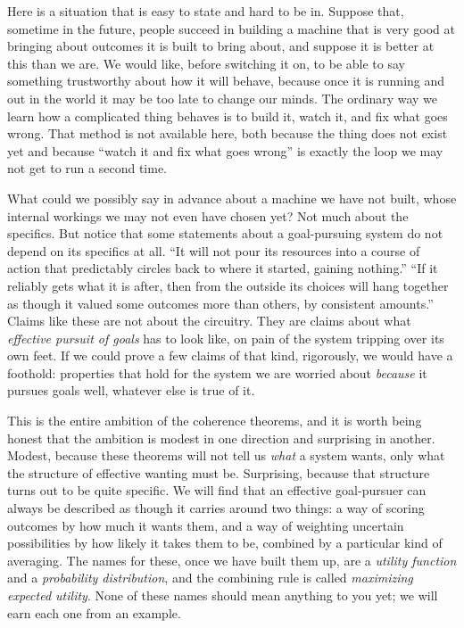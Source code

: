 \documentclass[10pt]{article}
\theoremstyle{definition}
\theoremstyle{remark}
\begin{document}
Here is a situation that is easy to state and hard to be in. Suppose that, sometime in the future, people succeed in building a machine that is very good at bringing about outcomes it is built to bring about, and suppose it is better at this than we are. We would like, before switching it on, to be able to say something trustworthy about how it will behave, because once it is running and out in the world it may be too late to change our minds. The ordinary way we learn how a complicated thing behaves is to build it, watch it, and fix what goes wrong. That method is not available here, both because the thing does not exist yet and because ``watch it and fix what goes wrong'' is exactly the loop we may not get to run a second time.

What could we possibly say in advance about a machine we have not built, whose internal workings we may not even have chosen yet? Not much about the specifics. But notice that some statements about a goal-pursuing system do not depend on its specifics at all. ``It will not pour its resources into a course of action that predictably circles back to where it started, gaining nothing.'' ``If it reliably gets what it is after, then from the outside its choices will hang together as though it valued some outcomes more than others, by consistent amounts.'' Claims like these are not about the circuitry. They are claims about what \emph{effective pursuit of goals} has to look like, on pain of the system tripping over its own feet. If we could prove a few claims of that kind, rigorously, we would have a foothold: properties that hold for the system we are worried about \emph{because} it pursues goals well, whatever else is true of it.

This is the entire ambition of the coherence theorems, and it is worth being honest that the ambition is modest in one direction and surprising in another. Modest, because these theorems will not tell us \emph{what} a system wants, only what the structure of effective wanting must be. Surprising, because that structure turns out to be quite specific. We will find that an effective goal-pursuer can always be described as though it carries around two things: a way of scoring outcomes by how much it wants them, and a way of weighting uncertain possibilities by how likely it takes them to be, combined by a particular kind of averaging. The names for these, once we have built them up, are a \emph{utility function} and a \emph{probability distribution}, and the combining rule is called \emph{maximizing expected utility}. None of these names should mean anything to you yet; we will earn each one from an example.
\end{document}
